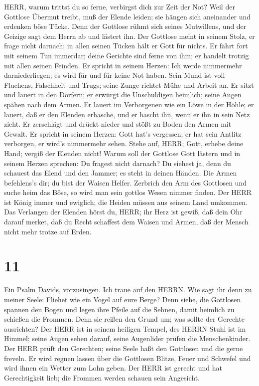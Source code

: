  HERR, warum trittst du so ferne, verbirgst dich zur Zeit
der Not?  Weil der Gottlose Übermut treibt, muß der Elende
leiden; sie hängen sich aneinander und erdenken böse Tücke. 
Denn der Gottlose rühmt sich seines Mutwillens, und der Geizige sagt dem
Herrn ab und lästert ihn.  Der Gottlose meint in seinem
Stolz, er frage nicht darnach; in allen seinen Tücken hält er Gott für
nichts.  Er fährt fort mit seinem Tun immerdar; deine
Gerichte sind ferne von ihm; er handelt trotzig mit allen seinen
Feinden.  Er spricht in seinem Herzen: Ich werde nimmermehr
darniederliegen; es wird für und für keine Not haben.  Sein
Mund ist voll Fluchens, Falschheit und Trugs; seine Zunge richtet Mühe
und Arbeit an.  Er sitzt und lauert in den Dörfern; er
erwürgt die Unschuldigen heimlich; seine Augen spähen nach dem Armen.
 Er lauert im Verborgenen wie ein Löwe in der Höhle; er
lauert, daß er den Elenden erhasche, und er hascht ihn, wenn er ihn in
sein Netz zieht.  Er zerschlägt und drückt nieder und stößt
zu Boden den Armen mit Gewalt.  Er spricht in seinem
Herzen: Gott hat's vergessen; er hat sein Antlitz verborgen, er wird's
nimmermehr sehen.  Stehe auf, HERR; Gott, erhebe deine
Hand; vergiß der Elenden nicht!  Warum soll der Gottlose
Gott lästern und in seinem Herzen sprechen: Du fragest nicht darnach?
 Du siehest ja, denn du schauest das Elend und den Jammer;
es steht in deinen Händen. Die Armen befehlens's dir; du bist der Waisen
Helfer.  Zerbrich den Arm des Gottlosen und suche heim das
Böse, so wird man sein gottlos Wesen nimmer finden.  Der
HERR ist König immer und ewiglich; die Heiden müssen aus seinem Land
umkommen.  Das Verlangen der Elenden hörst du, HERR; ihr
Herz ist gewiß, daß dein Ohr darauf merket,  daß du Recht
schaffest dem Waisen und Armen, daß der Mensch nicht mehr trotze auf
Erden.

\hypertarget{section-10}{%
\section{11}\label{section-10}}

 Ein Psalm Davids, vorzusingen. Ich traue auf den HERRN. Wie
sagt ihr denn zu meiner Seele: Fliehet wie ein Vogel auf eure Berge?
 Denn siehe, die Gottlosen spannen den Bogen und legen ihre
Pfeile auf die Sehnen, damit heimlich zu schießen die Frommen.
 Denn sie reißen den Grund um; was sollte der Gerechte
ausrichten?  Der HERR ist in seinem heiligen Tempel, des
HERRN Stuhl ist im Himmel; seine Augen sehen darauf, seine Augenlider
prüfen die Menschenkinder.  Der HERR prüft den Gerechten;
seine Seele haßt den Gottlosen und die gerne freveln.  Er
wird regnen lassen über die Gottlosen Blitze, Feuer und Schwefel und
wird ihnen ein Wetter zum Lohn geben.  Der HERR ist gerecht
und hat Gerechtigkeit lieb; die Frommen werden schauen sein Angesicht.

